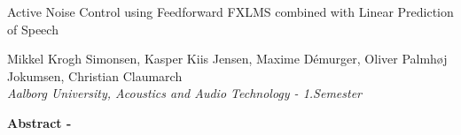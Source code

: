 
\begin{center}
\begin{huge}
Active Noise Control using Feedforward FXLMS combined with Linear Prediction of Speech
\end{huge}

\vspace{5mm}
Mikkel Krogh Simonsen, Kasper Kiis Jensen, Maxime Démurger, Oliver Palmhøj Jokumsen, Christian Claumarch
\\
\textit{Aalborg University, Acoustics and Audio Technology - 1.Semester}


\vspace{5mm}

\textbf{Abstract -} \lipsum[2]



\end{center}